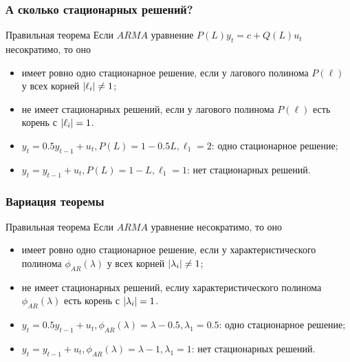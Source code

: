 \begin{frame}
  \frametitle{А сколько стационарных решений?}

  \begin{block}{Правильная теорема}
    Если $ARMA$ уравнение $P(L) y_t = c + Q(L) u_t$ несократимо, то оно 
    \begin{itemize}
      \item имеет ровно одно стационарное решение, если у лагового полинома $P(\ell)$ у всех корней $\abs{\ell_i} \neq 1$;
      \item не имеет стационарных решений, если у лагового полинома $P(\ell)$ есть корень с $\abs{\ell_i} = 1$.
    \end{itemize}    
  \end{block}

  \pause
  \begin{itemize}
    \item $y_t = 0.5 y_{t-1} + u_t, P(L) = 1 - 0.5L, \ell_1 = 2$: \pause одно стационарное решение;
  \end{itemize}
  \pause  
  \begin{itemize}
    \item $y_t = y_{t-1} + u_t, P(L) = 1 - L, \ell_1 = 1$:  нет стационарных решений. 
  \end{itemize}
    
\end{frame}



\begin{frame}
  \frametitle{Вариация теоремы}

  \begin{block}{Правильная теорема}
    Если $ARMA$ уравнение несократимо, то оно 
    \begin{itemize}
      \item имеет ровно одно стационарное решение, если у характеристического полинома $\phi_{AR}(\lambda)$ у всех корней $\abs{\lambda_i} \neq 1$;
      \item не имеет стационарных решений, еслиу характеристического полинома $\phi_{AR}(\lambda)$ есть корень с $\abs{\lambda_i} = 1$.
    \end{itemize}    
  \end{block}



  \pause
  \begin{itemize}
    \item $y_t = 0.5 y_{t-1} + u_t, \phi_{AR}(\lambda) = \lambda - 0.5, \lambda_1 = 0.5$: \pause одно стационарное решение;
  \end{itemize}
  \pause  
  \begin{itemize}
    \item $y_t = y_{t-1} + u_t, \phi_{AR}(\lambda) = \lambda - 1, \lambda_1 = 1$: нет стационарных решений. 
  \end{itemize}

\end{frame}




